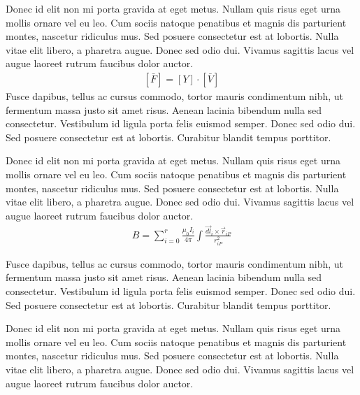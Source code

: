 \documentclass[journal]{../template/IEEEtran}
\begin{document}
Donec id elit non mi porta gravida at eget metus. Nullam quis risus eget urna mollis ornare vel eu leo. Cum sociis natoque penatibus et magnis dis parturient montes, nascetur ridiculus mus. Sed posuere consectetur est at lobortis. Nulla vitae elit libero, a pharetra augue. Donec sed odio dui. Vivamus sagittis lacus vel augue laoreet rutrum faucibus dolor auctor.
\begin{align}
	\label{eq:full}
	\left[\bar{F} \right] = \left[Y \right] \cdot \left[ \bar{V} \right]
\end{align}
Fusce dapibus, tellus ac cursus commodo, tortor mauris condimentum nibh, ut fermentum massa justo sit amet risus. Aenean lacinia bibendum nulla sed consectetur. Vestibulum id ligula porta felis euismod semper. Donec sed odio dui. Sed posuere consectetur est at lobortis. Curabitur blandit tempus porttitor.

Donec id elit non mi porta gravida at eget metus. Nullam quis risus eget urna mollis ornare vel eu leo. Cum sociis natoque penatibus et magnis dis parturient montes, nascetur ridiculus mus. Sed posuere consectetur est at lobortis. Nulla vitae elit libero, a pharetra augue. Donec sed odio dui. Vivamus sagittis lacus vel augue laoreet rutrum faucibus dolor auctor.
\begin{align}
	\label{eq:biot}
    B=\sum^{r}_{i=0} {\frac{\mu_{0}I_{i}}{4\pi}\int{\frac{\overrightarrow{dl}_{i}\times \overrightarrow{r}_{iP}}{r^{2}_{iP}}}}	
\end{align}

Fusce dapibus, tellus ac cursus commodo, tortor mauris condimentum nibh, ut fermentum massa justo sit amet risus. Aenean lacinia bibendum nulla sed consectetur. Vestibulum id ligula porta felis euismod semper. Donec sed odio dui. Sed posuere consectetur est at lobortis. Curabitur blandit tempus porttitor.

Donec id elit non mi porta gravida at eget metus. Nullam quis risus eget urna mollis ornare vel eu leo. Cum sociis natoque penatibus et magnis dis parturient montes, nascetur ridiculus mus. Sed posuere consectetur est at lobortis. Nulla vitae elit libero, a pharetra augue. Donec sed odio dui. Vivamus sagittis lacus vel augue laoreet rutrum faucibus dolor auctor.
\end{document}
